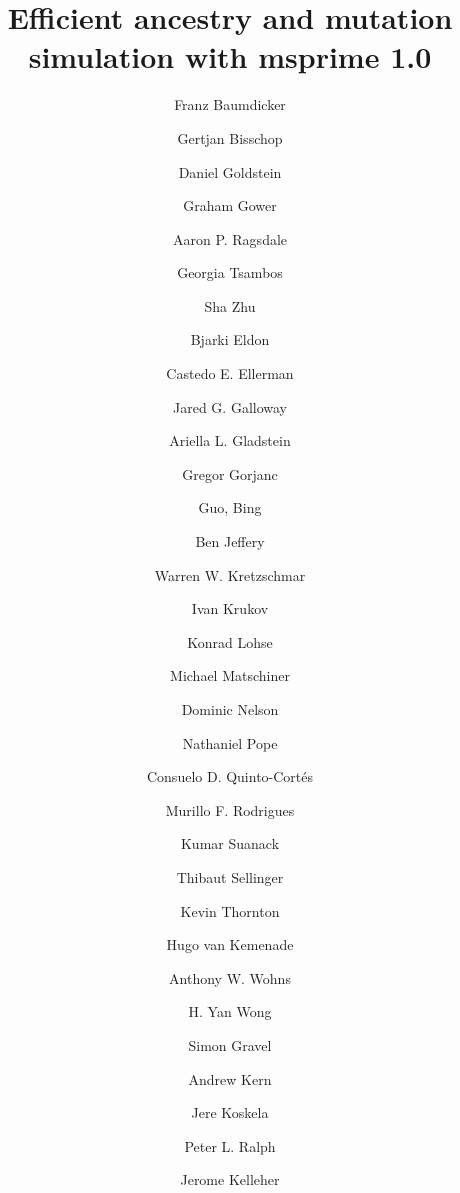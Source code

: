 \documentclass{article}
\begin{document}
\title{Efficient ancestry and mutation simulation with msprime 1.0}
\author[1,$\star$]{Franz Baumdicker}
\author[2,$\star$]{Gertjan Bisschop}
\author[3,$\star$]{Daniel Goldstein}
\author[4,$\star$]{Graham Gower}
\author[5,$\star$]{Aaron P. Ragsdale}
\author[6,$\star$]{Georgia Tsambos}
\author[7,$\star$]{Sha Zhu}

\author[8]{Bjarki Eldon}
\author[9]{Castedo E. Ellerman}
\author[10]{Jared G. Galloway}
\author[11]{Ariella L. Gladstein}
\author[12]{Gregor Gorjanc}
\author[13]{Guo, Bing}
\author[7]{Ben Jeffery}
\author[14]{Warren W. Kretzschmar}
\author[15]{Ivan Krukov}
\author[2]{Konrad Lohse}
\author[16]{Michael Matschiner}
\author[15]{Dominic Nelson}
\author[17]{Nathaniel Pope}
\author[18]{Consuelo D. Quinto-Cort\'es}
\author[10]{Murillo F. Rodrigues}
\author[19]{Kumar Suanack}
\author[20]{Thibaut Sellinger}
\author[21]{Kevin Thornton}
\author[22]{Hugo van Kemenade}
\author[7]{Anthony W. Wohns}
\author[7]{H. Yan Wong}

\author[15,$\dagger$]{Simon Gravel}
\author[10,$\dagger$]{Andrew Kern}
\author[23,$\dagger$]{Jere Koskela}
\author[10,24,$\dagger$]{Peter L. Ralph}

\author[7,$\ddagger$]{Jerome Kelleher}

\end{document}
